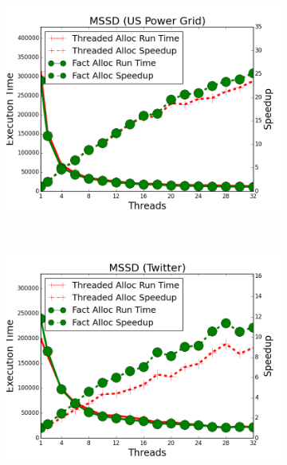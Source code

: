 \begin{figure}[h]
        ~
        \begin{subfigure}[b]{\smallplotsize\textwidth}
                \includegraphics[width=\textwidth]{experiments/scalability/node-allocator-shortest-uspowergrid.png}
                \label{fig:implementation:node_sssp}
        \end{subfigure}
        ~
        \begin{subfigure}[b]{\smallplotsize\textwidth}
                \includegraphics[width=\textwidth]{experiments/scalability/node-allocator-shortest-twitter.png}
                \label{fig:implementation:node_sssp}
        \end{subfigure}\\
        \begin{subfigure}[b]{\smallplotsize\textwidth}

\end{subfigure}
\end{figure}
